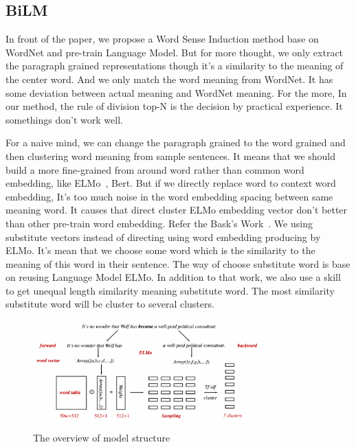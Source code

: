 \subsection{BiLM}
\label{sec:bilm}

In front of the paper, we propose a Word Sense Induction method base on WordNet and pre-train Language Model.
But for more thought, we only extract the paragraph grained representations though it's a similarity to the meaning of the center word.
And we only match the word meaning from WordNet. It has some deviation between actual meaning and WordNet meaning.
For the more, In our method, the rule of division top-N is the decision by practical experience. It somethings don't work well.

For a naive mind, we can change the paragraph grained to the word grained and then clustering word meaning from sample sentences.
It means that we should build a more fine-grained from around word rather than common word embedding, like ELMo~\cite{Peters:2018}, Bert.
But if we directly replace word to context word embedding, It's too much noise in the word embedding spacing between same meaning word.
It causes that direct cluster ELMo embedding vector don't better than other pre-train word embedding.
Refer the Bask's Work~\cite{baskaya2013ai}. We using substitute vectors instead of directing using word embedding producing by ELMo.
It's mean that we choose some word which is the similarity to the meaning of this word in their sentence.
The way of choose substitute word is base on reusing Language Model ELMo.
In addition to that work, we also use a skill to get unequal length similarity meaning substitute word.
The most similarity substitute word will be cluster to several clusters. 

\begin{figure}[ht]
    \begin{center}
    \includegraphics[width=0.85\textwidth]{figures/BiLM.pdf}
    \end{center}
    \caption{The overview of model structure}
    \label{fig:overall_model}
\end{figure}

